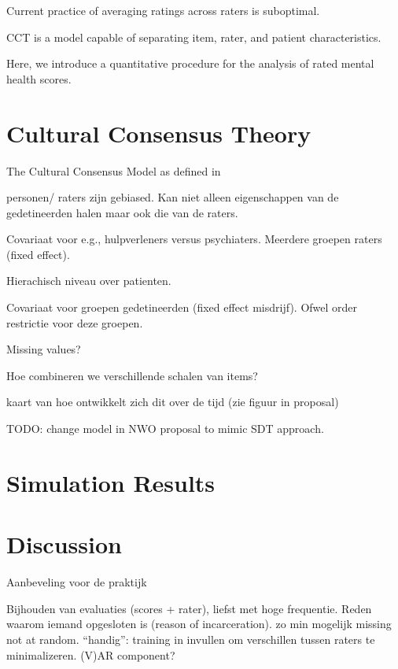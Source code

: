 \documentclass{article}
\begin{document}
Current practice of averaging ratings across raters is suboptimal.

CCT is a model capable of separating item, rater, and patient characteristics.

Here, we introduce a quantitative procedure for the analysis of rated mental health scores. 

\section*{Cultural Consensus Theory}

The Cultural Consensus Model as defined in \cite{Anders2015cultural}




personen/ raters zijn gebiased. Kan niet alleen eigenschappen van de gedetineerden halen maar ook die van de raters.

Covariaat voor e.g., hulpverleners versus psychiaters. Meerdere groepen raters (fixed effect).

Hierachisch niveau over patienten.

Covariaat voor groepen gedetineerden (fixed effect misdrijf).
Ofwel order restrictie voor deze groepen.

Missing values?

Hoe combineren we verschillende schalen van items?

kaart van hoe ontwikkelt zich dit over de tijd (zie figuur in proposal)

TODO: change model in NWO proposal to mimic SDT approach.

\section*{Simulation Results}


\section*{Discussion}

Aanbeveling voor de praktijk

Bijhouden van evaluaties (scores + rater), liefst met hoge frequentie. 
Reden waarom iemand opgesloten is (reason of incarceration).
zo min mogelijk missing not at random.
``handig'': training in invullen om verschillen tussen raters te minimalizeren.
(V)AR component?
\end{document}
